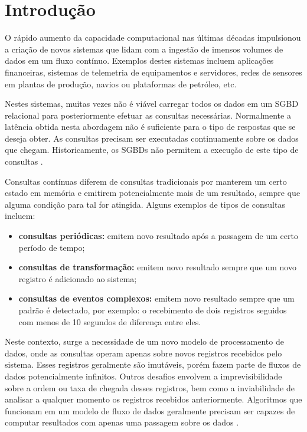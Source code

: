 \chapter{Introdução}

O rápido aumento da capacidade computacional nas últimas décadas impulsionou a criação de novos sistemas que lidam com a ingestão de imensos volumes de dados em um fluxo contínuo. Exemplos destes sistemas incluem aplicações financeiras, sistemas de telemetria de equipamentos e servidores, redes de sensores em plantas de produção, navios ou plataformas de petróleo, etc.

Nestes sistemas, muitas vezes não é viável carregar todos os dados em um SGBD relacional para posteriormente efetuar as consultas necessárias. Normalmente a latência obtida nesta abordagem não é suficiente para o tipo de respostas que se deseja obter. As consultas precisam ser executadas continuamente sobre os dados que chegam. Historicamente, os SGBDs não permitem a execução de este tipo de consultas \cite{terry1992continuous}.

Consultas contínuas diferem de consultas tradicionais por manterem um certo estado em memória e emitirem potencialmente mais de um resultado, sempre que alguma condição para tal for atingida. Alguns exemplos de tipos de consultas incluem:

\begin{itemize}
  \item \textbf{consultas periódicas:} emitem novo resultado após a passagem de um certo período de tempo;
  \item \textbf{consultas de transformação:} emitem novo resultado sempre que um novo registro é adicionado ao sistema;
  \item \textbf{consultas de eventos complexos:} emitem novo resultado sempre que um padrão é detectado, por exemplo: o recebimento de dois registros seguidos com menos de 10 segundos de diferença entre eles.
\end{itemize}

Neste contexto, surge a necessidade de um novo modelo de processamento de dados, onde as consultas operam apenas sobre novos registros recebidos pelo sistema. Esses registros geralmente são imutáveis, porém fazem parte de fluxos de dados potencialmente infinitos. Outros desafios envolvem a imprevisibilidade sobre a ordem ou taxa de chegada desses registros, bem como a inviabilidade de analisar a qualquer momento os registros recebidos anteriormente. Algoritmos que funcionam em um modelo de fluxo de dados geralmente precisam ser capazes de computar resultados com apenas uma passagem sobre os dados \cite{babcock2002models}.

